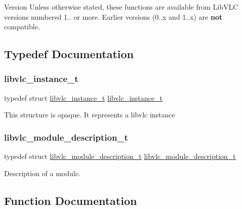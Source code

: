 \begin{DoxyVersion}{Version}
Unless otherwise stated, these functions are available from Lib\+V\+LC versions numbered 1.. or more. Earlier versions (0..\+x and 1..\+x) are {\bfseries not} compatible. 
\end{DoxyVersion}


\subsection{Typedef Documentation}
\mbox{\label{group__libvlc__core_ga316d739a80da4678206c79f4d6c2e284}} 
\subsubsection{\texorpdfstring{libvlc\+\_\+instance\+\_\+t}{libvlc\_instance\_t}}
{\footnotesize\ttfamily typedef struct \hyperlink{group__libvlc__core_ga316d739a80da4678206c79f4d6c2e284}{libvlc\+\_\+instance\+\_\+t} \hyperlink{group__libvlc__core_ga316d739a80da4678206c79f4d6c2e284}{libvlc\+\_\+instance\+\_\+t}}

This structure is opaque. It represents a libvlc instance \mbox{\label{group__libvlc__core_ga22f982caec39eee2f7bcb853513c9ebe}} 
\subsubsection{\texorpdfstring{libvlc\+\_\+module\+\_\+description\+\_\+t}{libvlc\_module\_description\_t}}
{\footnotesize\ttfamily typedef struct \hyperlink{structlibvlc__module__description__t}{libvlc\+\_\+module\+\_\+description\+\_\+t}  \hyperlink{structlibvlc__module__description__t}{libvlc\+\_\+module\+\_\+description\+\_\+t}}

Description of a module. 

\subsection{Function Documentation}
\mbox{\label{group__libvlc__core_gaee76d8daf854191af20a93eecea1dc6e}} 
